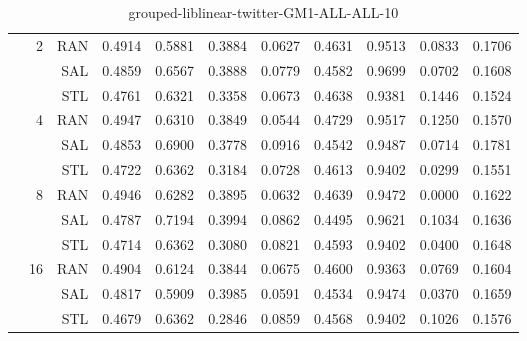 \begin{center}
\begin{table}[htbp]
\begin{tabular}{ | r | r | r | r | r | r | r | r | r | r | r |}
 & \multirow{3}{*}{2} & RAN & 0.4914 & 0.5881 & 0.3884 & 0.0627 & 0.4631 & 0.9513 & 0.0833 & 0.1706\\ \cline{3-11}
 &   & SAL & 0.4859 & 0.6567 & 0.3888 & 0.0779 & 0.4582 & 0.9699 & 0.0702 & 0.1608\\ \cline{3-11}
 &   & STL & 0.4761 & 0.6321 & 0.3358 & 0.0673 & 0.4638 & 0.9381 & 0.1446 & 0.1524\\ \cline{2-11}
 & \multirow{3}{*}{4} & RAN & 0.4947 & 0.6310 & 0.3849 & 0.0544 & 0.4729 & 0.9517 & 0.1250 & 0.1570\\ \cline{3-11}
 &   & SAL & 0.4853 & 0.6900 & 0.3778 & 0.0916 & 0.4542 & 0.9487 & 0.0714 & 0.1781\\ \cline{3-11}
 &   & STL & 0.4722 & 0.6362 & 0.3184 & 0.0728 & 0.4613 & 0.9402 & 0.0299 & 0.1551\\ \cline{2-11}
 & \multirow{3}{*}{8} & RAN & 0.4946 & 0.6282 & 0.3895 & 0.0632 & 0.4639 & 0.9472 & 0.0000 & 0.1622\\ \cline{3-11}
 &   & SAL & 0.4787 & 0.7194 & 0.3994 & 0.0862 & 0.4495 & 0.9621 & 0.1034 & 0.1636\\ \cline{3-11}
 &   & STL & 0.4714 & 0.6362 & 0.3080 & 0.0821 & 0.4593 & 0.9402 & 0.0400 & 0.1648\\ \cline{2-11}
 & \multirow{3}{*}{16} & RAN & 0.4904 & 0.6124 & 0.3844 & 0.0675 & 0.4600 & 0.9363 & 0.0769 & 0.1604\\ \cline{3-11}
 &   & SAL & 0.4817 & 0.5909 & 0.3985 & 0.0591 & 0.4534 & 0.9474 & 0.0370 & 0.1659\\ \cline{3-11}
 &   & STL & 0.4679 & 0.6362 & 0.2846 & 0.0859 & 0.4568 & 0.9402 & 0.1026 & 0.1576\\ \cline{2-11}
\hline
\end{tabular}
\caption{grouped-liblinear-twitter-GM1-ALL-ALL-10}
\end{table}
\end{center}

